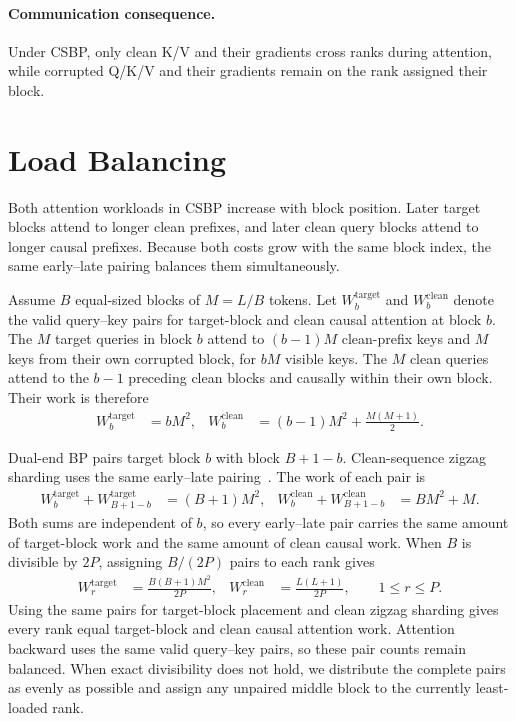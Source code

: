 \paragraph{Communication consequence.}
Under CSBP, only clean K/V and their gradients cross ranks during attention,
while corrupted Q/K/V and their gradients remain on the rank assigned their
block.

\section{Load Balancing}
\label{app:load-balancing}

Both attention workloads in CSBP increase with block position. Later
target blocks attend to longer clean prefixes, and later clean query blocks
attend to longer causal prefixes. Because both costs grow with the same block
index, the same early--late pairing balances them simultaneously.

Assume $B$ equal-sized blocks of $M=L/B$ tokens. Let
$W_b^{\mathrm{target}}$ and $W_b^{\mathrm{clean}}$ denote the valid query--key
pairs for target-block and clean causal attention at block $b$. The $M$ target
queries in block $b$ attend to $(b-1)M$ clean-prefix keys and $M$ keys from
their own corrupted block, for $bM$ visible keys. The $M$ clean queries attend
to the $b-1$ preceding clean blocks and causally within their own block. Their
work is therefore
\begin{align}
    W_b^{\mathrm{target}}
    &= bM^2,
    &
    W_b^{\mathrm{clean}}
    &= (b-1)M^2+\frac{M(M+1)}{2}.
    \label{eq:block-work-by-position}
\end{align}

Dual-end BP pairs target block $b$ with block $B+1-b$. Clean-sequence zigzag
sharding uses the same early--late pairing~\citep{dubey2024llama3}. The work of
each pair is
\begin{align}
    W_b^{\mathrm{target}}+W_{B+1-b}^{\mathrm{target}}
    &= (B+1)M^2,
    &
    W_b^{\mathrm{clean}}+W_{B+1-b}^{\mathrm{clean}}
    &= BM^2+M.
    \label{eq:aligned-pair-work}
\end{align}
Both sums are independent of $b$, so every early--late pair carries the same
amount of target-block work and the same amount of clean causal work. When $B$
is divisible by $2P$, assigning $B/(2P)$ pairs to each rank gives
\begin{align}
    W_r^{\mathrm{target}}
    &= \frac{B(B+1)M^2}{2P},
    &
    W_r^{\mathrm{clean}}
    &= \frac{L(L+1)}{2P},
    \qquad 1\leq r\leq P.
    \label{eq:aligned-rank-work}
\end{align}
Using the same pairs for target-block placement and clean zigzag sharding gives
every rank equal target-block and clean causal attention work. Attention
backward uses the same valid query--key pairs, so these pair counts remain
balanced. When exact divisibility does not hold, we distribute the complete
pairs as evenly as possible and assign any unpaired middle block to the
currently least-loaded rank.

